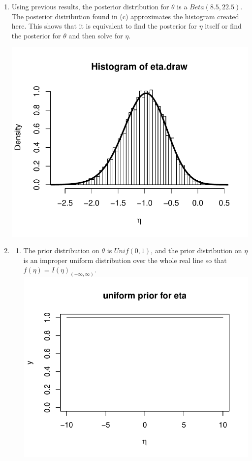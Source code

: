 \documentclass[12pt]{article}\usepackage[]{graphicx}\usepackage[]{color}
\newenvironment{knitrout}{}{} %
\begin{document}
\begin{doublespacing}
\begin{enumerate}
\begin{enumerate}
\item Using previous results, the posterior distribution for $\theta$ is a $Beta(8.5, 22.5)$. The posterior distribution found in (c) approximates the histogram created here. This shows that it is equivalent to find the posterior for $\eta$ itself or find the posterior for $\theta$ and then solve for $\eta$.

\begin{center}
\begin{knitrout}\footnotesize
{}\color{fgcolor}
\includegraphics[width=.5\linewidth]{figure/backtotheta-1} 

\end{knitrout}
\end{center}

\item \begin{enumerate}
\item The prior distribution on $\theta$ is $Unif(0, 1)$, and the prior distribution on $\eta$ is an improper uniform distribution over the whole real line so that $f(\eta)=I(\eta)_{(-\infty, \infty)}$. 
\begin{knitrout}\footnotesize
{}\color{fgcolor}
\includegraphics[width=.5\linewidth]{figure/etauniformprior-1} 

\end{knitrout}


\end{enumerate}
\end{enumerate}
\end{enumerate}
\end{doublespacing}
\end{document}
